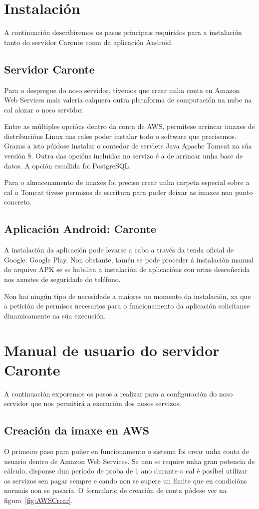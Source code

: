 \section{Instalación}
A continuación describiremos os pasos principais requiridos para a instalación tanto do servidor Caronte coma da aplicación Android.

\subsection{Servidor Caronte}
Para o despregue do noso servidor, tivemos que crear unha conta en Amazon Web Services mais valería calquera outra plataforma de computación na nube na cal aloxar o noso servidor.

Entre as múltiples opcións dentro da conta de AWS, permítese arrincar imaxes de distribucións Linux nas cales poder instalar todo o software que precisemos. Grazas a isto púidose instalar o contedor de servlets Java Apache Tomcat na súa versión 8. Outra das opcións incluídas no servizo é a de arrincar unha base de datos. A opción escollida foi PostgreSQL.

Para o almacenamento de imaxes foi preciso crear unha carpeta especial sobre a cal o Tomcat tivese permisos de escritura para poder deixar as imaxes nun punto concreto.

\subsection{Aplicación Android: Caronte}
A instalación da aplicación pode levarse a cabo a través da tenda oficial de Google: Google Play. Non obstante, tamén se pode proceder á instalación manual do arquivo APK se se habilita a instalación de aplicacións con orixe descoñecida nos axustes de seguridade do teléfono.

Non hai ningún tipo de necesidade a maiores no momento da instalación, xa que a petición de permisos necesarios para o funcionamento da aplicación solicítanse dinamicamente na súa execución.

\section{Manual de usuario do servidor Caronte}
A continuación exporemos os pasos a realizar para a configuración do noso servidor que nos permitirá a execución dos nosos servizos.

\subsection{Creación da imaxe en AWS}
O primeiro paso para poñer en funcionamento o sistema foi crear unha conta de usuario dentro de Amazon Web Services. Se non se require unha gran potencia de cálculo, disponse dun período de proba de 1 ano durante o cal é posíbel utilizar os servizos sen pagar sempre e cando non se supere un límite que en condicións normais non se pasaría. O formulario de creación de conta pódese ver na figura~\ref{fig:AWSCrear}.

